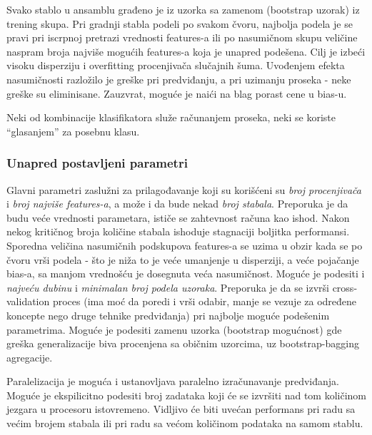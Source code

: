 \documentclass[fontsize=12bp, paper=a4]{scrarticle}
\begin{document}
Svako stablo u ansamblu građeno je iz uzorka sa zamenom (bootstrap uzorak) iz trening skupa.
Pri gradnji stabla podeli po svakom čvoru, najbolja podela je se pravi pri iscrpnoj pretrazi vrednosti features-a ili po nasumičnom skupu veličine naspram broja najviše mogućih features-a koja je unapred podešena. Cilj je izbeći visoku disperziju i overfitting procenjivača slučajnih šuma. Uvođenjem efekta nasumičnosti razložilo je greške pri predviđanju, a pri uzimanju proseka - neke greške su eliminisane. Zauzvrat, moguće je naići na blag porast cene u bias-u. 

Neki od kombinacije klasifikatora služe računanjem proseka, neki se koriste ``glasanjem'' za posebnu klasu.

\subsubsection{Unapred postavljeni parametri}
Glavni parametri zaslužni za prilagođavanje koji su korišćeni su \textit{broj procenjivača} i \textit{broj najviše features-a}, a može i da bude nekad \textit{broj stabala}. Preporuka je da budu veće vrednosti parametara, ističe se zahtevnost računa kao ishod. Nakon nekog kritičnog broja količine stabala ishoduje stagnaciji boljitka performansi. Sporedna veličina nasumičnih podskupova features-a se uzima u obzir kada se po čvoru vrši podela - što je niža to je veće umanjenje u disperziji, a veće pojačanje bias-a, sa manjom vrednošću je dosegnuta veća nasumičnost. Moguće je podesiti i \textit{najveću dubinu} i \textit{minimalan broj podela uzoraka}. Preporuka je da se izvrši cross-validation proces (ima moć da poredi i vrši odabir, manje se vezuje za određene koncepte nego druge tehnike predviđanja\cite{cv}) pri najbolje moguće podešenim parametrima. Moguće je podesiti zamenu uzorka (bootstrap mogućnost) gde greška generalizacije biva procenjena sa običnim uzorcima, uz bootstrap-bagging agregacije. 

Paralelizacija je moguća i ustanovljava paralelno izračunavanje predviđanja. Moguće je ekspilicitno podesiti broj zadataka koji će se izvršiti nad tom količinom jezgara u procesoru istovremeno. Vidljivo će biti uvećan performans pri radu sa većim brojem stabala ili pri radu sa većom količinom podataka na samom stablu.
\end{document}
